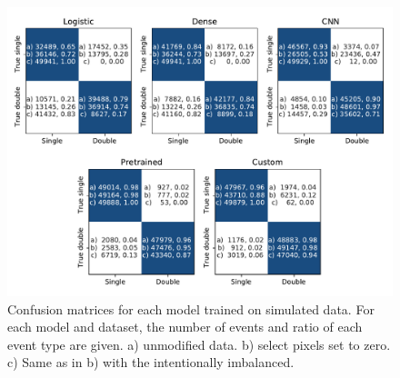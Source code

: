 \begin{figure}
\centering
\includegraphics[width=\textwidth]{chapters/results/figures/confmat_simulated.pdf}
\caption{\label{fig:confmat-simulated}Confusion matrices for each model trained
on simulated data. For each model and dataset, the number of events and ratio of each
event type are given. a) unmodified data. b) select pixels set to zero. c) Same as in b)
with the intentionally imbalanced.}
\end{figure}